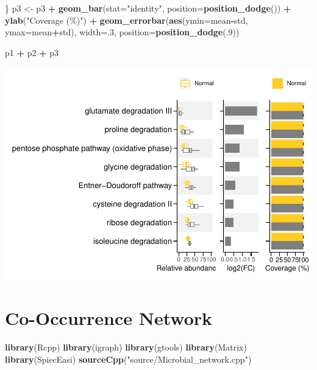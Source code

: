 \documentclass[
]{article}
\newenvironment{Shaded}{\begin{snugshade}}{\end{snugshade}}
\newcommand{\AttributeTok}[1]{\textcolor[rgb]{0.13,0.29,0.53}{#1}}
\newcommand{\DecValTok}[1]{\textcolor[rgb]{0.00,0.00,0.81}{#1}}
\newcommand{\FunctionTok}[1]{\textcolor[rgb]{0.13,0.29,0.53}{\textbf{#1}}}
\newcommand{\NormalTok}[1]{#1}
\newcommand{\OtherTok}[1]{\textcolor[rgb]{0.56,0.35,0.01}{#1}}
\newcommand{\SpecialCharTok}[1]{\textcolor[rgb]{0.81,0.36,0.00}{\textbf{#1}}}
\newcommand{\StringTok}[1]{\textcolor[rgb]{0.31,0.60,0.02}{#1}}
\begin{document}
\begin{Shaded}
\begin{Highlighting}[]
\NormalTok{\}}
\NormalTok{p3 }\OtherTok{\textless{}{-}}\NormalTok{ p3 }\SpecialCharTok{+} \FunctionTok{geom\_bar}\NormalTok{(}\AttributeTok{stat=}\StringTok{"identity"}\NormalTok{, }\AttributeTok{position=}\FunctionTok{position\_dodge}\NormalTok{()) }\SpecialCharTok{+} \FunctionTok{ylab}\NormalTok{(}\StringTok{"Coverage (\%)"}\NormalTok{) }\SpecialCharTok{+}
           \FunctionTok{geom\_errorbar}\NormalTok{(}\FunctionTok{aes}\NormalTok{(}\AttributeTok{ymin=}\NormalTok{mean}\SpecialCharTok{{-}}\NormalTok{std, }\AttributeTok{ymax=}\NormalTok{mean}\SpecialCharTok{+}\NormalTok{std), }\AttributeTok{width=}\NormalTok{.}\DecValTok{3}\NormalTok{, }\AttributeTok{position=}\FunctionTok{position\_dodge}\NormalTok{(.}\DecValTok{9}\NormalTok{)) }

\NormalTok{p1 }\SpecialCharTok{+}\NormalTok{ p2 }\SpecialCharTok{+}\NormalTok{ p3}
\end{Highlighting}
\end{Shaded}

\includegraphics{workshop_files/figure-latex/unnamed-chunk-64-1.pdf}

\hypertarget{co-occurrence-network}{%
\section{Co-Occurrence Network}\label{co-occurrence-network}}

\begin{Shaded}
\begin{Highlighting}[]
\FunctionTok{library}\NormalTok{(Rcpp)}
\FunctionTok{library}\NormalTok{(igraph) }
\FunctionTok{library}\NormalTok{(gtools)}
\FunctionTok{library}\NormalTok{(Matrix)}
\FunctionTok{library}\NormalTok{(SpiecEasi)}
\FunctionTok{sourceCpp}\NormalTok{(}\StringTok{"source/Microbial\_network.cpp"}\NormalTok{)}
\end{Highlighting}
\end{Shaded}
\end{document}
